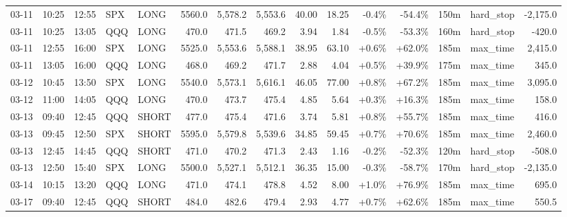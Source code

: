\documentclass[11pt,a4paper,twoside]{article}
\begin{document}
\begin{landscape}
\begin{center}
\begin{longtable}{>{\color{txtmain}}l l l l l r r r r r r r r >{\color{txtmain}}l r}
03-11 & 10:25 & 12:55 & SPX & LONG & 5560.0 & 5,578.2 & 5,553.6 & 40.00 & 18.25 & \textcolor{lossred}{-0.4\%} & \textcolor{lossred}{-54.4\%} & 150m & hard\_stop & \textcolor{lossred}{-2,175.0} \\
03-11 & 10:25 & 13:05 & QQQ & LONG & 470.0 & 471.5 & 469.2 & 3.94 & 1.84 & \textcolor{lossred}{-0.5\%} & \textcolor{lossred}{-53.3\%} & 160m & hard\_stop & \textcolor{lossred}{-420.0} \\
03-11 & 12:55 & 16:00 & SPX & LONG & 5525.0 & 5,553.6 & 5,588.1 & 38.95 & 63.10 & \textcolor{wingreen}{+0.6\%} & \textcolor{wingreen}{+62.0\%} & 185m & max\_time & \textcolor{wingreen}{2,415.0} \\
03-11 & 13:05 & 16:00 & QQQ & LONG & 468.0 & 469.2 & 471.7 & 2.88 & 4.04 & \textcolor{wingreen}{+0.5\%} & \textcolor{wingreen}{+39.9\%} & 175m & max\_time & \textcolor{wingreen}{345.0} \\
03-12 & 10:45 & 13:50 & SPX & LONG & 5540.0 & 5,573.1 & 5,616.1 & 46.05 & 77.00 & \textcolor{wingreen}{+0.8\%} & \textcolor{wingreen}{+67.2\%} & 185m & max\_time & \textcolor{wingreen}{3,095.0} \\
03-12 & 11:00 & 14:05 & QQQ & LONG & 470.0 & 473.7 & 475.4 & 4.85 & 5.64 & \textcolor{wingreen}{+0.3\%} & \textcolor{wingreen}{+16.3\%} & 185m & max\_time & \textcolor{wingreen}{158.0} \\
03-13 & 09:40 & 12:45 & QQQ & SHORT & 477.0 & 475.4 & 471.6 & 3.74 & 5.81 & \textcolor{wingreen}{+0.8\%} & \textcolor{wingreen}{+55.7\%} & 185m & max\_time & \textcolor{wingreen}{416.0} \\
03-13 & 09:45 & 12:50 & SPX & SHORT & 5595.0 & 5,579.8 & 5,539.6 & 34.85 & 59.45 & \textcolor{wingreen}{+0.7\%} & \textcolor{wingreen}{+70.6\%} & 185m & max\_time & \textcolor{wingreen}{2,460.0} \\
03-13 & 12:45 & 14:45 & QQQ & SHORT & 471.0 & 470.2 & 471.3 & 2.43 & 1.16 & \textcolor{lossred}{-0.2\%} & \textcolor{lossred}{-52.3\%} & 120m & hard\_stop & \textcolor{lossred}{-508.0} \\
03-13 & 12:50 & 15:40 & SPX & LONG & 5500.0 & 5,527.1 & 5,512.1 & 36.35 & 15.00 & \textcolor{lossred}{-0.3\%} & \textcolor{lossred}{-58.7\%} & 170m & hard\_stop & \textcolor{lossred}{-2,135.0} \\
03-14 & 10:15 & 13:20 & QQQ & LONG & 471.0 & 474.1 & 478.8 & 4.52 & 8.00 & \textcolor{wingreen}{+1.0\%} & \textcolor{wingreen}{+76.9\%} & 185m & max\_time & \textcolor{wingreen}{695.0} \\
03-17 & 09:40 & 12:45 & QQQ & SHORT & 484.0 & 482.6 & 479.4 & 2.93 & 4.77 & \textcolor{wingreen}{+0.7\%} & \textcolor{wingreen}{+62.6\%} & 185m & max\_time & \textcolor{wingreen}{550.5} \\

\end{longtable}
\end{center}
\end{landscape}
\end{document}
